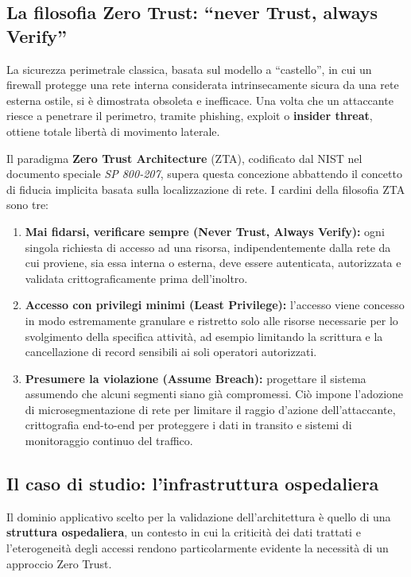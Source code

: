 \subsection{La filosofia Zero Trust: ``never Trust, always Verify''}
La sicurezza perimetrale classica, basata sul modello a ``castello'', in cui un firewall protegge una rete interna considerata intrinsecamente sicura da una rete esterna ostile, si è dimostrata obsoleta e inefficace. Una volta che un attaccante riesce a penetrare il perimetro, tramite phishing, exploit o \textbf{insider threat}, ottiene totale libertà di movimento laterale.

Il paradigma \textbf{Zero Trust Architecture} (ZTA), codificato dal NIST nel documento speciale \textit{SP 800-207}, supera questa concezione abbattendo il concetto di fiducia implicita basata sulla localizzazione di rete. I cardini della filosofia ZTA sono tre:
\begin{enumerate}
    \item \textbf{Mai fidarsi, verificare sempre (Never Trust, Always Verify):} ogni singola richiesta di accesso ad una risorsa, indipendentemente dalla rete da cui proviene, sia essa interna o esterna, deve essere autenticata, autorizzata e validata crittograficamente prima dell'inoltro.
    \item \textbf{Accesso con privilegi minimi (Least Privilege):} l'accesso viene concesso in modo estremamente granulare e ristretto solo alle risorse necessarie per lo svolgimento della specifica attività, ad esempio limitando la scrittura e la cancellazione di record sensibili ai soli operatori autorizzati.
    \item \textbf{Presumere la violazione (Assume Breach):} progettare il sistema assumendo che alcuni segmenti siano già compromessi. Ciò impone l'adozione di microsegmentazione di rete per limitare il raggio d'azione dell'attaccante, crittografia end-to-end per proteggere i dati in transito e sistemi di monitoraggio continuo del traffico.
\end{enumerate}

\subsection{Il caso di studio: l'infrastruttura ospedaliera}
Il dominio applicativo scelto per la validazione dell'architettura è quello di una \textbf{struttura ospedaliera}, un contesto in cui la criticità dei dati trattati e l'eterogeneità degli accessi rendono particolarmente evidente la necessità di un approccio Zero Trust.

